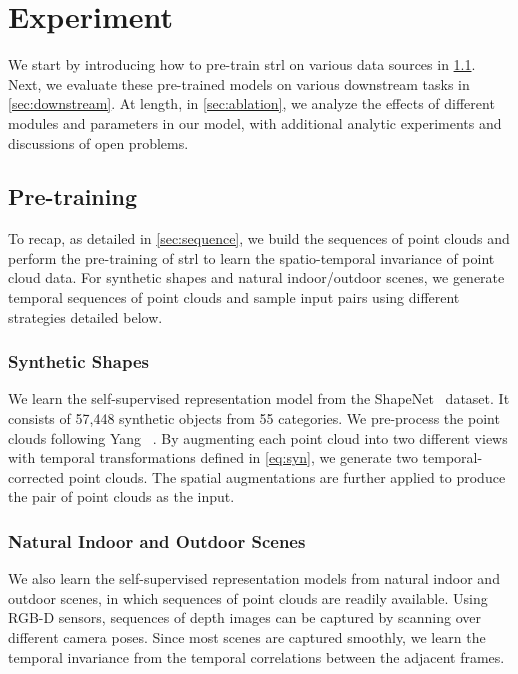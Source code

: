 \documentclass[10pt,twocolumn,letterpaper]{article}
\makeatletter
\renewcommand{\paragraph}{\@startsection{paragraph}{4}{\z@}{0ex \@plus 0ex \@minus 0ex}{-1em}{\hskip\parindent\normalfont\normalsize\bfseries}}
\makeatother
\begin{document}
\section{Experiment}\label{sec:exp}

We start by introducing how to pre-train \ac{strl} on various data sources in \cref{sec:dataset}. Next, we evaluate these pre-trained models on various downstream tasks in \cref{sec:downstream}. At length, in \cref{sec:ablation}, we analyze the effects of different modules and parameters in our model, with additional analytic experiments and discussions of open problems.

\subsection{Pre-training}\label{sec:dataset}

To recap, as detailed in \cref{sec:sequence}, we build the sequences of point clouds and perform the pre-training of \ac{strl} to learn the spatio-temporal invariance of point cloud data. For synthetic shapes and natural indoor/outdoor scenes, we generate temporal sequences of point clouds and sample input pairs using different strategies detailed below.

\subsubsection{Synthetic Shapes}

\paragraph{ShapeNet}

We learn the self-supervised representation model from the ShapeNet~\cite{chang2015shapenet} dataset. It consists of 57,448 synthetic objects from 55 categories. We pre-process the point clouds following Yang \etal~\cite{yang2018foldingnet}. By augmenting each point cloud into two different views with temporal transformations defined in \cref{eq:syn}, we generate two temporal-corrected point clouds. The spatial augmentations are further applied to produce the pair of point clouds as the input.

\subsubsection{Natural Indoor and Outdoor Scenes}

We also learn the self-supervised representation models from natural indoor and outdoor scenes, in which sequences of point clouds are readily available. Using RGB-D sensors, sequences of depth images can be captured by scanning over different camera poses. Since most scenes are captured smoothly, we learn the temporal invariance from the temporal correlations between the adjacent frames.
\end{document}
